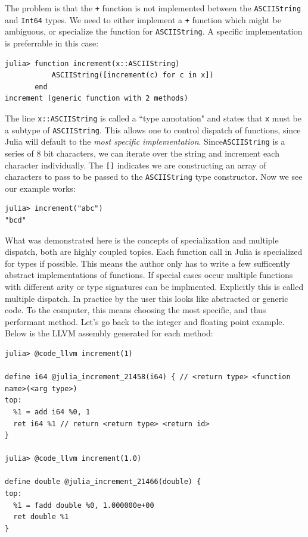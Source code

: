 \documentclass[a4paper]{article}
\begin{document}
The problem is that the \texttt{+} function is not implemented between the
\texttt{ASCIIString} and \texttt{Int64} types.
We need to either implement a \texttt{+} function
which might be ambiguous, or specialize the function for \texttt{ASCIIString}.
A specific implementation is preferrable in this case:
\begin{lstlisting}
julia> function increment(x::ASCIIString)
           ASCIIString([increment(c) for c in x])
       end
increment (generic function with 2 methods)
\end{lstlisting}
The line \texttt{x::ASCIIString} is called a ``type annotation" and
states that \texttt{x} must be a subtype
of \texttt{ASCIIString}. This allows one to control dispatch of functions,
since Julia will default to the \emph{most specific implementation}.
Since\texttt{ASCIIString} is a series of 8 bit characters, we can iterate over the
string and increment each character individually. The \texttt{[]} indicates we are
constructing an array of characters to pass to be passed to the \texttt{ASCIIString}
type constructor. Now we see our example works:
\begin{lstlisting}
julia> increment("abc")
"bcd"
\end{lstlisting}

What was demonstrated here is the concepts of specialization and multiple
dispatch, both are highly coupled topics.
Each function call in Julia is specialized for types if possible.
This means the author only has to write a few sufficently abstract
implementations of functions. If special cases occur multiple functions
with different arity or type signatures can be implmented. Explicitly
this is called multiple dispatch. In practice by the user this looks like
abstracted or generic code.
To the computer, this means choosing the most specific, and
thus performant method. Let's go back to the integer and floating point
example. Below is the LLVM assembly generated for each method:
\begin{lstlisting}
julia> @code_llvm increment(1)

define i64 @julia_increment_21458(i64) { // <return type> <function name>(<arg type>)
top:
  %1 = add i64 %0, 1
  ret i64 %1 // return <return type> <return id>
}

julia> @code_llvm increment(1.0)

define double @julia_increment_21466(double) {
top:
  %1 = fadd double %0, 1.000000e+00
  ret double %1
}
\end{lstlisting}
\end{document}
